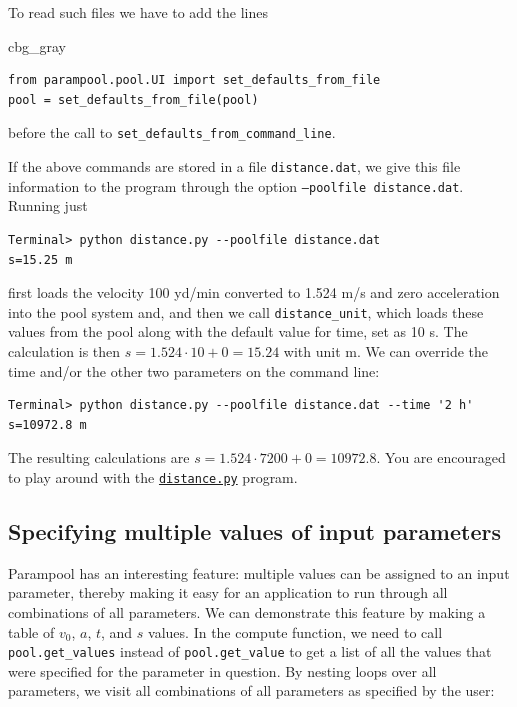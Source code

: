 \documentclass[graybox,envcountchap,sectrefs,final]{svmonodo}
\newenvironment{_cod_tight}[1]{
   \def\FrameCommand{\colorbox{#1}}
   \FrameRule0.6pt\MakeFramed {\FrameRestore}\vskip3mm}
   {\vskip0mm\endMakeFramed}
\newenvironment{cod}[1]{
\bgroup\rmfamily
\fboxsep=0mm\relax
\begin{_cod_tight}{#1}
\list{}{\parsep=-2mm\parskip=0mm\topsep=0pt\leftmargin=2mm
\rightmargin=2\leftmargin\leftmargin=4pt\relax}
\item\relax}
{\endlist\end{_cod_tight}\egroup}
\begin{document}
To read such files we have to add the lines

\begin{cod}{cbg_gray}\begin{Verbatim}[numbers=none,fontsize=\fontsize{9pt}{9pt},baselinestretch=0.95,xleftmargin=2mm]
from parampool.pool.UI import set_defaults_from_file
pool = set_defaults_from_file(pool)
\end{Verbatim}
\end{cod}
\noindent
before the call to \Verb!set_defaults_from_command_line!.

If the above commands are stored in a file \texttt{distance.dat}, we give
this file information to the program through the
option \texttt{--poolfile distance.dat}. Running just

\begin{Verbatim}[frame=lines,label=\fbox{{\tiny Terminal}},framesep=2.5mm,framerule=0.7pt,fontsize=\fontsize{9pt}{9pt}]
Terminal> python distance.py --poolfile distance.dat
s=15.25 m
\end{Verbatim}
first loads the velocity
100 yd/min converted to 1.524 m/s and zero acceleration
into the pool system and, and then we call \Verb!distance_unit!, which
loads these values from the pool along with the default value for
time, set as 10 s. The calculation is then $s=1.524\cdot 10 + 0=15.24$
with unit m. We can override the time and/or the other two
parameters on the command line:

\begin{Verbatim}[frame=lines,label=\fbox{{\tiny Terminal}},framesep=2.5mm,framerule=0.7pt,fontsize=\fontsize{9pt}{9pt}]
Terminal> python distance.py --poolfile distance.dat --time '2 h'
s=10972.8 m
\end{Verbatim}
The resulting calculations are $s=1.524\cdot 7200 + 0 =10972.8$.
You are encouraged to play around with the \href{{http://tinyurl.com/o8pb3yy/distance.py}}{\nolinkurl{distance.py}} program.


\subsection{Specifying multiple values of input parameters}

Parampool has an interesting feature: multiple values can be assigned
to an input parameter, thereby making it easy for an application to
run through all combinations of all parameters.
We can demonstrate this feature by making a table of $v_0$, $a$, $t$, and
$s$ values. In the compute function, we need to call \Verb!pool.get_values!
instead of \Verb!pool.get_value! to get a list of all the values that
were specified for the parameter in question. By nesting loops over
all parameters, we visit all combinations of all parameters as
specified by the user:
\end{document}
